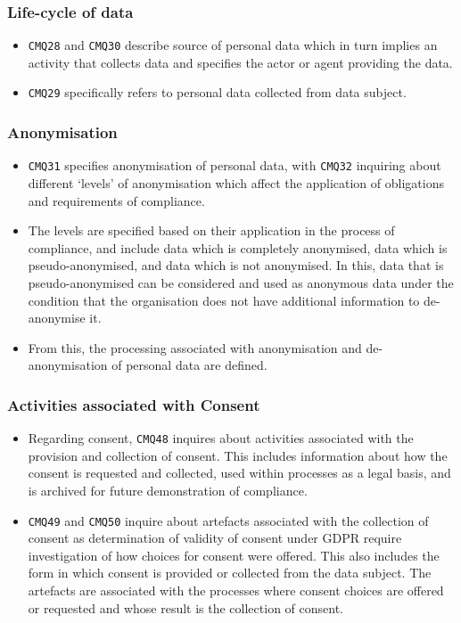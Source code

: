 \subsubsection{Life-cycle of data}
\begin{itemize}
    \item \texttt{CMQ28} and \texttt{CMQ30} describe source of personal data which in turn implies an activity that collects data and specifies the actor or agent providing the data.
    \item \texttt{CMQ29} specifically refers to personal data collected from data subject.
\end{itemize}

\subsubsection{Anonymisation}
\begin{itemize}
    \item \texttt{CMQ31} specifies anonymisation of personal data, with \texttt{CMQ32} inquiring about different `levels' of anonymisation which affect the application of obligations and requirements of compliance. 
    \item The levels are specified based on their application in the process of compliance, and include data which is completely anonymised, data which is pseudo-anonymised, and data which is not anonymised. In this, data that is pseudo-anonymised can be considered and used as anonymous data under the condition that the organisation does not have additional information to de-anonymise it. 
    \item From this, the processing associated with anonymisation and de-anonymisation of personal data are defined.
\end{itemize}

\subsubsection{Activities associated with Consent}
\begin{itemize}
    \item Regarding consent, \texttt{CMQ48} inquires about activities associated with the provision and collection of consent. This includes information about how the consent is requested and collected, used within processes as a legal basis, and is archived for future demonstration of compliance.
    \item \texttt{CMQ49} and \texttt{CMQ50} inquire about artefacts associated with the collection of consent as determination of validity of consent under GDPR require investigation of how choices for consent were offered. This also includes the form in which consent is provided or collected from the data subject. The artefacts are associated with the processes where consent choices are offered or requested and whose result is the collection of consent.
\end{itemize}

